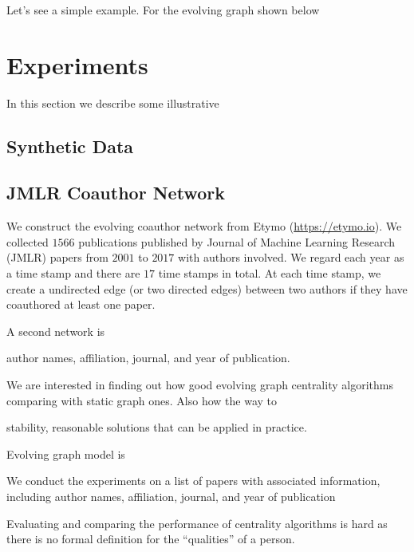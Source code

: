 \documentclass[12pt]{article}
\theoremstyle{definition}
\begin{document}
Let's see a simple example. For the evolving graph shown below

\section{Experiments}
\label{sec:experiments}

In this section we describe some illustrative 

\subsection{Synthetic Data}
\label{sec:synthetic-data}






\subsection{JMLR Coauthor Network}
\label{sec:jmlr-coauth-netw}


We construct the evolving coauthor network from Etymo (\url{https://etymo.io}).
We collected $1566$ publications published by Journal of Machine Learning Research (JMLR) papers from $2001$ to $2017$ with authors involved. We regard each year
as a time stamp and there are $17$ time stamps in total. At each time stamp, we 
create a undirected edge (or two directed edges) between two authors if they have coauthored at least one paper.

A second network is 

author names, affiliation, journal, and year of publication.

We are interested in finding out how good evolving graph centrality algorithms
comparing with static graph ones. 
Also how the way to 

stability, reasonable solutions that can be applied in practice. 




Evolving graph model is 

We conduct the experiments on a list of papers with associated information, including author names, affiliation, journal, and year of publication 

Evaluating and comparing the performance of centrality algorithms is hard as there is no formal definition for the ``qualities'' of a person.
\end{document}
